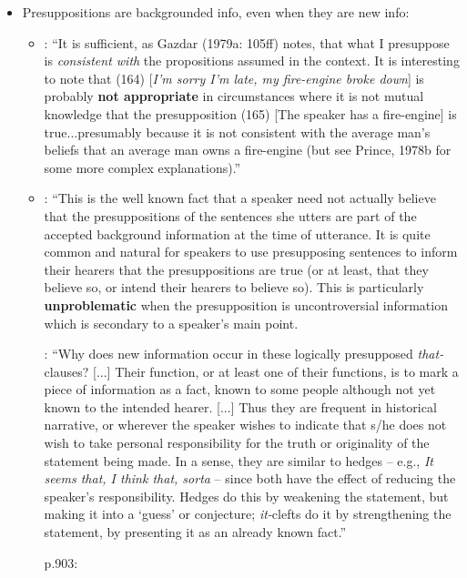 \documentclass[11pt,fleqn]{article}
\newcommand{\6}{\mbox{$[\hspace*{-.6mm}[$}}
\newcommand{\9}{\mbox{$]\hspace*{-.6mm}]$}}
\begin{document}
{\begin{itemize}

\item Presuppositions are backgrounded info, even when they are new info:

\begin{itemize}

\item \citealt[205]{levinson83}: ``It is sufficient, as Gazdar (1979a: 105ff) notes, that what I presuppose is {\em consistent with} the propositions assumed in the context. It is interesting to note that (164) [{\em I'm sorry I'm late, my fire-engine broke down}] is probably {\bf not appropriate} in circumstances where it is not mutual knowledge that the presupposition (165) [The speaker has a fire-engine] is true...presumably because it is not consistent with the average man's beliefs that an average man owns a fire-engine (but see Prince, 1978b for some more complex explanations).''

\item \citealt[252]{simons2003}: ``This is the well known fact that a speaker need not actually believe that the presuppositions of the sentences she utters are part of the accepted background information at the time of utterance. It is quite common and natural for speakers to use presupposing sentences to inform their hearers that the presuppositions are true (or at least, that they believe so, or intend their hearers to believe so). This is particularly {\bf unproblematic} when the presupposition is uncontroversial information which is secondary to a speaker’s main point.


\citealt[899]{prince1978}: ``Why does new information occur in these logically presupposed {\em that-}clauses? [...] Their function, or at least one of their functions, is to mark a piece of information as a fact, known to some people although not yet known to the intended hearer. [...] Thus they are frequent in historical narrative, or wherever the speaker wishes to indicate that s/he does not wish to take personal responsibility for the truth or originality of the statement being made. In a sense, they are similar to hedges -- e.g., {\em It seems that, I think that, sorta} -- since both have the effect of reducing the speaker's responsibility. Hedges do this by weakening the statement, but making it into a `guess' or conjecture; {\em it-}clefts do it by strengthening the statement, by presenting it as an already known fact.''

p.903:


\end{itemize}
\end{itemize}}
\end{document}
